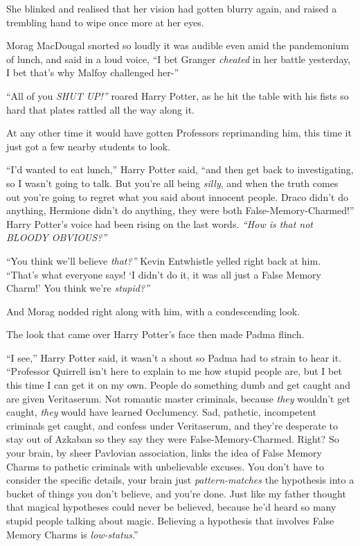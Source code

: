 She blinked and realised that her vision had gotten blurry again, and
raised a trembling hand to wipe once more at her eyes.

Morag MacDougal snorted so loudly it was audible even amid the
pandemonium of lunch, and said in a loud voice, ``I bet Granger
\emph{cheated} in her battle yesterday, I bet that's why Malfoy
challenged her-''

``All of you \emph{SHUT UP!''} roared Harry Potter, as he hit the table
with his fists so hard that plates rattled all the way along it.

At any other time it would have gotten Professors reprimanding him, this
time it just got a few nearby students to look.

``I'd wanted to eat lunch,'' Harry Potter said, ``and then get back to
investigating, so I wasn't going to talk. But you're all being
\emph{silly}, and when the truth comes out you're going to regret what
you said about innocent people. Draco didn't do anything, Hermione
didn't do anything, they were both False-Memory-Charmed!'' Harry
Potter's voice had been rising on the last words. \emph{``How is that
not BLOODY OBVIOUS?''}

``You think we'll believe \emph{that?''} Kevin Entwhistle yelled right
back at him. ``That's what everyone says! `I didn't do it, it was all
just a False Memory Charm!' You think we're \emph{stupid?''}

And Morag nodded right along with him, with a condescending look.

The look that came over Harry Potter's face then made Padma flinch.

``I see,'' Harry Potter said, it wasn't a shout so Padma had to strain
to hear it. ``Professor Quirrell isn't here to explain to me how stupid
people are, but I bet this time I can get it on my own. People do
something dumb and get caught and are given Veritaserum. Not romantic
master criminals, because \emph{they} wouldn't get caught, \emph{they}
would have learned Occlumency. Sad, pathetic, incompetent criminals get
caught, and confess under Veritaserum, and they're desperate to stay out
of Azkaban so they say they were False-Memory-Charmed. Right? So your
brain, by sheer Pavlovian association, links the idea of False Memory
Charms to pathetic criminals with unbelievable excuses. You don't have
to consider the specific details, your brain just \emph{pattern-matches}
the hypothesis into a bucket of things you don't believe, and you're
done. Just like my father thought that magical hypotheses could never be
believed, because he'd heard so many stupid people talking about magic.
Believing a hypothesis that involves False Memory Charms is
\emph{low-status}.''


